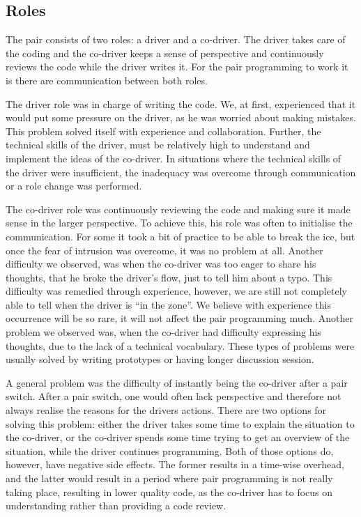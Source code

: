 \subsection{Roles}
The pair consists of two roles: a driver and a co-driver.
The driver takes care of the coding and the co-driver keeps a sense of perspective and continuously reviews the code while the driver writes it.
For the pair programming to work it is there are communication between both roles.

The driver role was in charge of writing the code.
We, at first, experienced that it would put some pressure on the driver, as he was worried about making mistakes.
This problem solved itself with experience and collaboration.
Further, the technical skills of the driver, must be relatively high to understand and implement the ideas of the co-driver.
In situations where the technical skills of the driver were insufficient, the inadequacy was overcome through communication or a role change was performed.

The co-driver role was continuously reviewing the code and making sure it made sense in the larger perspective.
To achieve this, his role was often to initialise the communication.
For some it took a bit of practice to be able to break the ice, but once the fear of intrusion was overcome, it was no problem at all.
Another difficulty we observed, was when the co-driver was too eager to share his thoughts, that he broke the driver's flow, just to tell him about a typo.
This difficulty was remedied through experience, however, we are still not completely able to tell when the driver is ``in the zone''.
We believe with experience this occurrence will be so rare, it will not affect the pair programming much.
Another problem we observed was, when the co-driver had difficulty expressing his thoughts, due to the lack of a technical vocabulary.
These types of problems were usually solved by writing prototypes or having longer discussion session.

A general problem was the difficulty of instantly being the co-driver after a pair switch.
After a pair switch, one would often lack perspective and therefore not always realise the reasons for the drivers actions.
There are two options for solving this problem: either the driver takes some time to explain the situation to the co-driver, or the co-driver spends some time trying to get an overview of the situation, while the driver continues programming.
Both of those options do, however, have  negative side effects.
The former results in a time-wise overhead, and the latter would result in a period where pair programming is not really taking place, resulting in lower quality code, as the co-driver has to focus on understanding rather than providing a code review.


